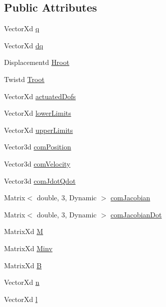 \subsection*{Public Attributes}
\begin{DoxyCompactItemize}
\item 
Vector\+Xd \hyperlink{structModel3T_1_1Pimpl_aafa871718688ff6322cbfffed9ada401}{q}
\item 
Vector\+Xd \hyperlink{structModel3T_1_1Pimpl_a38a7e4a5908517ee2bd63c75eb570f63}{dq}
\item 
Displacementd \hyperlink{structModel3T_1_1Pimpl_a02c47a2c2920e1ddfce6457502061f0b}{Hroot}
\item 
Twistd \hyperlink{structModel3T_1_1Pimpl_a5b282557f05769af0f2e60709d348a43}{Troot}
\item 
Vector\+Xd \hyperlink{structModel3T_1_1Pimpl_a7bf8960ca39185d73d9dcc28451ae7a3}{actuated\+Dofs}
\item 
Vector\+Xd \hyperlink{structModel3T_1_1Pimpl_a635ed979bb210444627f06eb65db8f29}{lower\+Limits}
\item 
Vector\+Xd \hyperlink{structModel3T_1_1Pimpl_a3b3b41e690971ea00156bdfefb813a5c}{upper\+Limits}
\item 
Vector3d \hyperlink{structModel3T_1_1Pimpl_a61412bd640cbf9f3bffa791261123328}{com\+Position}
\item 
Vector3d \hyperlink{structModel3T_1_1Pimpl_a80c7336da4224ba5105c067870e818bb}{com\+Velocity}
\item 
Vector3d \hyperlink{structModel3T_1_1Pimpl_a997711d057aa854ab997992497fe276b}{com\+Jdot\+Qdot}
\item 
Matrix$<$ double, 3, Dynamic $>$ \hyperlink{structModel3T_1_1Pimpl_ab93624d4ec1d08338eb24528b8a3ca68}{com\+Jacobian}
\item 
Matrix$<$ double, 3, Dynamic $>$ \hyperlink{structModel3T_1_1Pimpl_ad1f6cba54dc65db31d3a4e54ba00acdf}{com\+Jacobian\+Dot}
\item 
Matrix\+Xd \hyperlink{structModel3T_1_1Pimpl_a2756947646bc2a7485760f1599011764}{M}
\item 
Matrix\+Xd \hyperlink{structModel3T_1_1Pimpl_a6e50170f8b2b58e1e7a91244ffe1691c}{Minv}
\item 
Matrix\+Xd \hyperlink{structModel3T_1_1Pimpl_a79e662bd2907360085b1adda5a2217b6}{B}
\item 
Vector\+Xd \hyperlink{structModel3T_1_1Pimpl_a964360277690839fc358bb663a2cd949}{n}
\item 
Vector\+Xd \hyperlink{structModel3T_1_1Pimpl_a7fcae8ba57e320a9066aa9b640f414cb}{l}

\end{DoxyCompactItemize}
